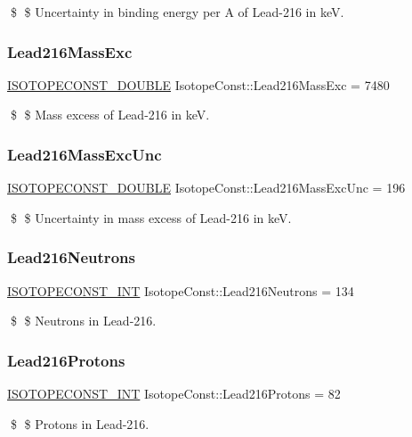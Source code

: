 \$ \$ Uncertainty in binding energy per A of Lead-\/216 in keV. \mbox{\label{group___isotope_const-_lead-_pb216_ga55982e8a4b9e6ba0acdbeba77387999c}} 
\subsubsection{\texorpdfstring{Lead216\+Mass\+Exc}{Lead216MassExc}}
{\footnotesize\ttfamily \mbox{\hyperlink{group___isotope_const-_macros_ga8f45a7272ce02c0b4c65c44636ed719a}{I\+S\+O\+T\+O\+P\+E\+C\+O\+N\+S\+T\+\_\+\+D\+O\+U\+B\+LE}} Isotope\+Const\+::\+Lead216\+Mass\+Exc = 7480}

\$ \$ Mass excess of Lead-\/216 in keV. \mbox{\label{group___isotope_const-_lead-_pb216_ga963b8c6bbb3d9b5e00105948f699e662}} 
\subsubsection{\texorpdfstring{Lead216\+Mass\+Exc\+Unc}{Lead216MassExcUnc}}
{\footnotesize\ttfamily \mbox{\hyperlink{group___isotope_const-_macros_ga8f45a7272ce02c0b4c65c44636ed719a}{I\+S\+O\+T\+O\+P\+E\+C\+O\+N\+S\+T\+\_\+\+D\+O\+U\+B\+LE}} Isotope\+Const\+::\+Lead216\+Mass\+Exc\+Unc = 196}

\$ \$ Uncertainty in mass excess of Lead-\/216 in keV. \mbox{\label{group___isotope_const-_lead-_pb216_ga7fbee6b0db6958c52fb21dd97d6112c5}} 
\subsubsection{\texorpdfstring{Lead216\+Neutrons}{Lead216Neutrons}}
{\footnotesize\ttfamily \mbox{\hyperlink{group___isotope_const-_macros_ga5f18360b3e99483a35c32d789e62621c}{I\+S\+O\+T\+O\+P\+E\+C\+O\+N\+S\+T\+\_\+\+I\+NT}} Isotope\+Const\+::\+Lead216\+Neutrons = 134}

\$ \$ Neutrons in Lead-\/216. \mbox{\label{group___isotope_const-_lead-_pb216_ga61b844deda163ab49236127f334d27a5}} 
\subsubsection{\texorpdfstring{Lead216\+Protons}{Lead216Protons}}
{\footnotesize\ttfamily \mbox{\hyperlink{group___isotope_const-_macros_ga5f18360b3e99483a35c32d789e62621c}{I\+S\+O\+T\+O\+P\+E\+C\+O\+N\+S\+T\+\_\+\+I\+NT}} Isotope\+Const\+::\+Lead216\+Protons = 82}

\$ \$ Protons in Lead-\/216. 